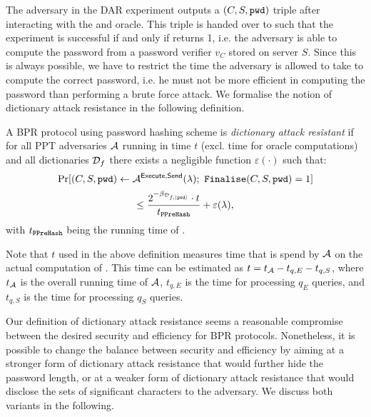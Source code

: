 \noindent
The adversary in the DAR experiment outputs a $(C,S,\mathtt{pwd})$ triple after interacting with the \Execute and \Send oracle.
This triple is handed over to \Finalise such that the experiment is successful if and only if \Finalise returns 1, i.e. the adversary is able to compute the password \pwd from a password verifier $v_C$ stored on server $S$.
Since this is always possible, we have to restrict the time the adversary is allowed to take to compute the correct password, i.e. he must not be more efficient in computing the password than performing a brute force attack.
We formalise the notion of dictionary attack resistance in the following definition.

\begin{definition}\label{def:dar}
A BPR protocol using password hashing scheme \Hash is \emph{dictionary attack resistant} if for all PPT adversaries $\mathcal{A}$ running in time $t$ (excl. time for oracle computations) and all dictionaries $\mathcal{D}_f$ there exists a negligible function $\varepsilon(\cdot)$ such that:
\[\Pr[(C,S,\mathtt{pwd})\gets\mathcal{A}^{\mathsf{Execute}, \mathsf{Send}}(\lambda);~ \mathtt{Finalise}(C,S,\mathtt{pwd})=1] \]
\[\leq \frac{2^{-\beta_{\mathcal{D}_{f,|\mathtt{pwd}|}}}\cdot t}{t_{\mathtt{PPreHash}}} + \varepsilon(\lambda),\]
with $t_\mathtt{PPreHash}$ being the running time of \PPreHash.
\end{definition}

\noindent
Note that $t$ used in the above definition measures time that is spend by $\mathcal{A}$ on the actual computation of \pwd. This time can be estimated as $t=t_\mathcal{A}-t_{q,E}-t_{q,S}$, where  $t_\mathcal{A}$ is the overall running time of $\mathcal{A}$, $t_{q,E}$ is the time for processing $q_E$ \Execute queries, and $t_{q,S}$ is the time for processing $q_S$ \Send queries. 


Our definition of dictionary attack resistance seems a reasonable compromise between the desired security and efficiency for BPR protocols.
Nonetheless, it is possible to change the balance between security and efficiency by aiming at a stronger form of dictionary attack resistance that would further hide the password length, or at a weaker form of dictionary attack resistance that would disclose the sets of significant characters to the adversary. We discuss both variants in the following.

